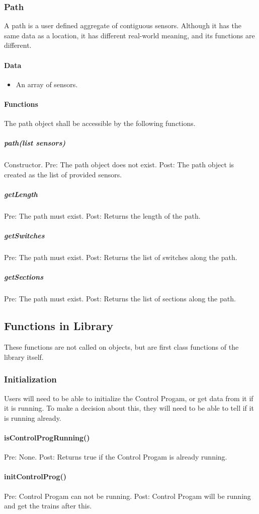 \documentclass[a4paper,11pt,notitlepage]{article}
\def\CS{Control Progam\xspace} \def\LC{Local Copy of Train State\xspace} \def\TN{Track Node\xspace}
\begin{document}
\subsubsection{Path}
A path is a user defined aggregate of contiguous sensors. Although it has the same data as a location, it has different real-world meaning, and its functions are different.
\paragraph{Data}
\begin{itemize}
\item An array of sensors.
\end{itemize}
\paragraph{Functions}
The path object shall be accessible by the following functions.
\subparagraph{path(list sensors)} Constructor. Pre: The path object does not exist. Post: The path object is created as the list of provided sensors.
\subparagraph{getLength} Pre: The path must exist. Post: Returns the length of the path.
\subparagraph{getSwitches} Pre: The path must exist.  Post: Returns the list of switches along the path.
\subparagraph{getSections} Pre: The path must exist.  Post: Returns the list of sections along the path.


\subsection{Functions in Library}
These functions are not called on objects, but are first class functions of the library itself.

\subsubsection{Initialization}
Users will need to be able to initialize the \CS, or get data from it if it is running. To make a decision about this, they will need to be able to tell if it is running already.
\paragraph{isControlProgRunning()} Pre: None. Post: Returns true if the \CS is already running.
\paragraph{initControlProg()} Pre: \CS can not be running. Post: \CS will be running and get the trains after this. %
\end{document}
